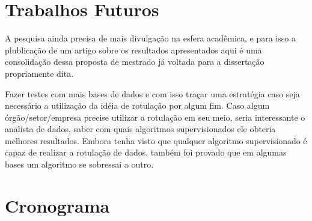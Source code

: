 \section*{Trabalhos Futuros}

A pesquisa ainda precisa de mais divulgação na esfera acadêmica, e para isso a plublicação de um artigo sobre os resultados apresentados aqui é uma consolidação dessa proposta de mestrado já voltada para a dissertação propriamente dita.

Fazer testes com mais bases de dados  e com isso traçar uma estratégia caso seja necessário a utilização da idéia de rotulação por algum fim. Caso algum órgão/setor/empresa precise utilizar a rotulação em seu meio, seria interessante o analista de dados,  saber com quais algoritmos supervisionados ele obteria melhores resultados. Embora tenha visto que qualquer algoritmo supervisionado é capaz de realizar a rotulação de dados, também foi provado que em algumas bases um algoritmo se sobressai a outro.




\section*{Cronograma}

